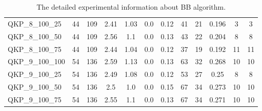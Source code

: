 \begin{table}[!h]
{\begin{tabular}{lccccccccccc}
QKP\_8\_100\_25 & 44 & 109 & 2.41 & 1.03 & 0.0 & 0.12 & 41 & 21 & 0.196 & 3 & 3\\
QKP\_8\_100\_50 & 44 & 109 & 2.56 & 1.1 & 0.0 & 0.13 & 43 & 22 & 0.204 & 8 & 8\\
QKP\_8\_100\_75 & 44 & 109 & 2.44 & 1.04 & 0.0 & 0.12 & 37 & 19 & 0.192 & 11 & 11\\
QKP\_9\_100\_100 & 54 & 136 & 2.59 & 1.13 & 0.0 & 0.13 & 63 & 32 & 0.268 & 10 & 10\\
QKP\_9\_100\_25 & 54 & 136 & 2.49 & 1.08 & 0.0 & 0.12 & 53 & 27 & 0.25 & 8 & 8\\
QKP\_9\_100\_50 & 54 & 136 & 2.5 & 1.0 & 0.0 & 0.15 & 67 & 34 & 0.273 & 10 & 10\\
QKP\_9\_100\_75 & 54 & 136 & 2.55 & 1.1 & 0.0 & 0.13 & 67 & 34 & 0.271 & 10 & 10\\
\bottomrule
\end{tabular}%
}%
\caption{The detailed experimental information about BB algorithm.}
\label{tab:table_$m}
\end{table}


